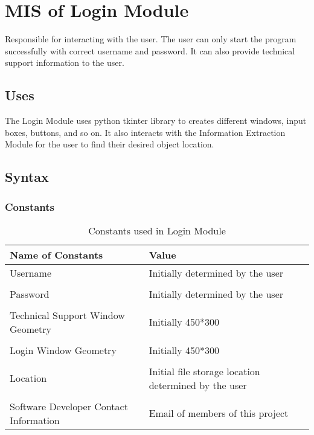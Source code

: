 \documentclass[12pt, titlepage]{article}
\begin{document}
\newpage

\section{MIS of Login Module} 

Responsible for interacting with the user. The user can only start the program successfully with correct username and password. It can also provide technical support information to the user.

\subsection{Uses}
The Login Module uses python tkinter library to creates different windows, input boxes, buttons, and so on. It also interacts with the Information Extraction Module for the user to find their desired object location. 

\subsection{Syntax}

\subsubsection{Constants}


\begin{table}[H]
\caption{Constants used in Login Module} 
\begin{tabularx}{\textwidth}{XX}
\toprule
\textbf{Name of Constants} & \textbf{Value}\\
\midrule
Username & Initially determined by the user\\\\
Password & Initially determined by the user\\\\
Technical Support Window Geometry & Initially 450*300\\\\
Login Window Geometry & Initially 450*300\\\\
Location & Initial file storage location determined by the user\\\\
Software Developer Contact Information & Email of members of this project\\

\bottomrule
\end{tabularx}
\end{table}
\end{document}

